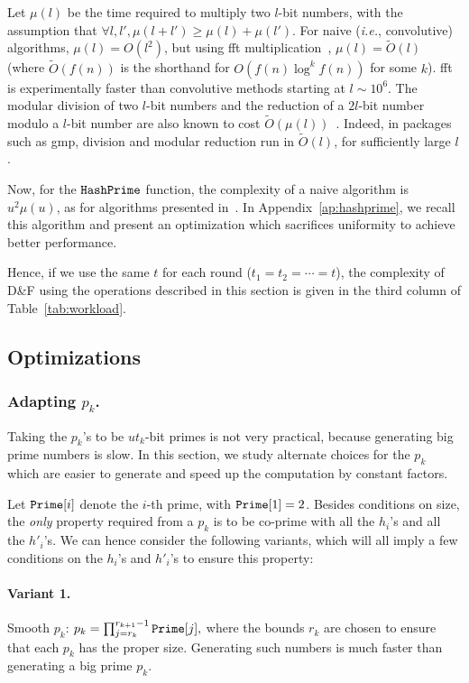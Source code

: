 \documentclass[twoside,envcountsame,runningheads]{llncs}
\newcommand{\Oapp}{\ensuremath{\tilde{O}}}
\newcommand{\df}{D\&F\xspace}
\newcommand{\ie}{\textit{i.e.}\xspace}
\newcommand{\apref}[1]{Appendix~\ref{#1}}
\newcommand{\apref}[1]{the full version~\cite{X:ABBMNR13}}
\begin{document}
Let $\mu(l)$ be the time required to multiply two $l$-bit numbers, with the assumption that $\forall l,l', \mu(l+l') \ge \mu(l) + \mu(l')$.
For naive (\ie, convolutive) algorithms, $\mu(l) = O(l^2)$, but using {\sc fft} multiplication~\cite{schonhage1971schnelle}, $\mu(l) = \Oapp(l)$ (where $\Oapp(f(n))$ is the shorthand for $O(f(n) \log^k f(n))$ for some $k$). {\sc fft} is experimentally faster than convolutive methods starting at $l \sim 10^6$.
The modular division of two $l$-bit numbers and the reduction of a $2l$-bit number modulo a $l$-bit number are also known to cost $\Oapp(\mu(l))$~\cite{burnikel1998fast}.
Indeed, in packages such as {\sf gmp}, division and modular reduction run in $\Oapp(l)$, for sufficiently large $l$.

Now, for the $\tt HashPrime$ function, the complexity of a naive algorithm is $u^2 \mu(u)$, as for algorithms presented in~\cite{C:HohWat09,PKC:AbdBenPoi13}.
In \apref{ap:hashprime}, we recall this algorithm and present an optimization which sacrifices uniformity to achieve better performance.

Hence, if we use the same $t$ for each round ($t_1=t_2=\cdots=t$), the complexity of \df using the operations described in this section is given in the third column of Table~\ref{tab:workload}.

\subsection{Optimizations}

\subsubsection{Adapting $p_k$.}
\label{sec:choicep}

Taking the $p_k$'s to be $ut_k$-bit primes is not very practical, because generating big prime numbers is slow. In this section, we study alternate choices for the $p_k$ which are easier to generate and speed up the computation by constant factors.

Let $\mbox{{\tt Prime}}[i]$ denote the $i$-th prime, with $\mbox{{\tt Prime}}[1]=2$. Besides conditions on size, the \textit{only} property required from a $p_k$ is to be co-prime with all the $h_i$'s and all the $h'_i$'s. We can hence consider the following variants, which will all imply a few conditions on the $h_i$'s and $h'_i$'s to ensure this property:
\paragraph{Variant 1.} Smooth $p_k$:
$ p_k=\prod_{j=r_k}^{r_{k+1}-1} \mbox{{\tt Prime}}[j], $
where the bounds $r_k$ are chosen to ensure that each $p_k$ has the proper size.
Generating such numbers is much faster than generating a big prime $p_k$.
\end{document}
